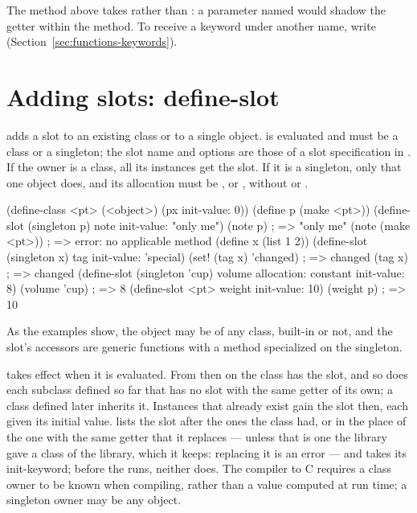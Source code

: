 \noindent The  method above takes  rather than
: a parameter named  would shadow the getter
 within the method. To receive a keyword under another name,
write  (Section~\ref{sec:functions-keywords}).

\section{Adding slots: define-slot}\label{sec:classes-define-slot}

\begin{quote}
\end{quote}

\noindent {} adds a slot to an existing class or to a
single object.  is evaluated and must be a class or a
singleton; the slot name and options are those of a slot specification in
. If the owner is a class, all its instances get the
slot. If it is a singleton, only that one object does, and its allocation
must be ,  or , without
 or .

\begin{dylan}
(define-class <pt> (<object>) (px init-value: 0))
(define p (make <pt>))
(define-slot (singleton p) note init-value: "only me")
(note p)                       ; => "only me"
(note (make <pt>))             ; => error: no applicable method
(define x (list 1 2))
(define-slot (singleton x) tag init-value: 'special)
(set! (tag x) 'changed)        ; => changed
(tag x)                        ; => changed
(define-slot (singleton 'cup) volume allocation: constant init-value: 8)
(volume 'cup)                  ; => 8
(define-slot <pt> weight init-value: 10)
(weight p)                     ; => 10
\end{dylan}

\noindent As the examples show, the object may be of any class, built-in or
not, and the slot's accessors are generic functions with a method
specialized on the singleton.

 takes effect when it is evaluated. From then on the
class has the slot, and so does each subclass defined so far that has no
slot with the same getter of its own; a class defined later inherits it.
Instances that already exist gain the slot then, each given its initial
value.  lists the slot after the ones the class
had, or in the place of the one with the same getter that it replaces
--- unless that is one the library gave a class of the library, which it
keeps: replacing it is an error ---
and  takes its init-keyword; before the 
runs, neither does. The compiler to C requires a class owner to be known
when compiling, rather than a value computed at run time; a singleton
owner may be any object.

